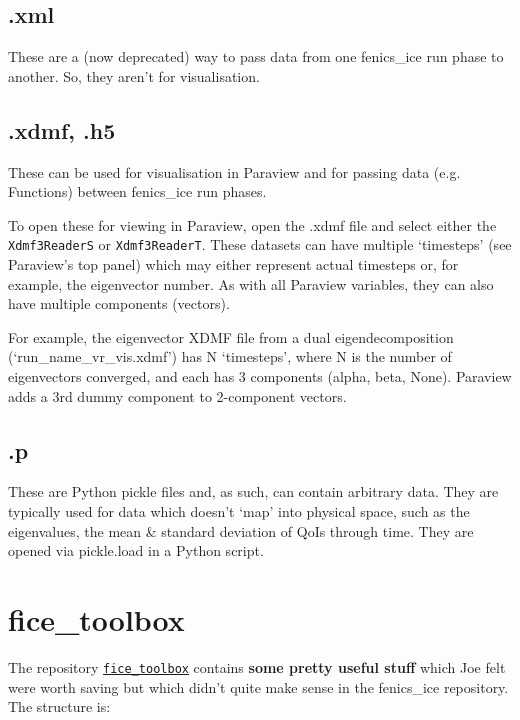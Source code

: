 \documentclass[11pt, reqno, nocenter]{article}
\begin{document}
\subsection{.xml}

These are a (now deprecated) way to pass data from one fenics\_ice run phase to another. So, they aren't for visualisation.

\subsection{.xdmf, .h5}

These can be used for visualisation in Paraview and for passing data (e.g. Functions) between fenics\_ice run phases.

To open these for viewing in Paraview, open the .xdmf file and select either the \texttt{Xdmf3ReaderS} or \texttt{Xdmf3ReaderT}. These datasets can have multiple `timesteps' (see Paraview's top panel) which may either represent actual timesteps or, for example, the eigenvector number. As with all Paraview variables, they can also have multiple components (vectors).

For example, the eigenvector XDMF file from a dual eigendecomposition (`run\_name\_vr\_vis.xdmf') has N `timesteps', where N is the number of eigenvectors converged, and each has 3 components (alpha, beta, None). Paraview adds a 3rd dummy component to 2-component vectors.

\subsection{.p}

These are Python pickle files and, as such, can contain arbitrary data. They are typically used for data which doesn't `map' into physical space, such as the eigenvalues, the mean \& standard deviation of QoIs through time. They are opened via pickle.load in a Python script.

\section{fice\_toolbox}

The repository \href{https://github.com/EdiGlacUQ/fice_toolbox}{{\tt fice\_toolbox}} contains \textbf{some pretty useful stuff} which Joe felt were worth saving but which didn't quite make sense in the fenics\_ice repository. The structure is: \\

\end{document}
